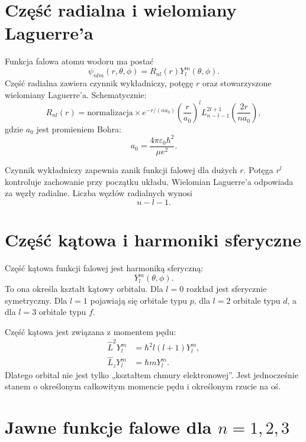 \section{Część radialna i wielomiany Laguerre'a}

Funkcja falowa atomu wodoru ma postać
\begin{equation}
    \psi_{nlm}(r,\theta,\phi)=R_{nl}(r)Y_l^m(\theta,\phi).
\end{equation}
Część radialna zawiera czynnik wykładniczy, potęgę \(r\) oraz stowarzyszone wielomiany Laguerre'a. Schematycznie:
\begin{equation}
    R_{nl}(r)=\text{normalizacja}\times e^{-r/(na_0)}
    \left(\frac{r}{a_0}\right)^l
    L_{n-l-1}^{2l+1}\left(\frac{2r}{na_0}\right),
\end{equation}
gdzie \(a_0\) jest promieniem Bohra:
\begin{equation}
    a_0=\frac{4\pi\varepsilon_0\hbar^2}{\mu e^2}.
\end{equation}

Czynnik wykładniczy zapewnia zanik funkcji falowej dla dużych \(r\). Potęga \(r^l\) kontroluje zachowanie przy początku układu. Wielomian Laguerre'a odpowiada za węzły radialne. Liczba węzłów radialnych wynosi
\begin{equation}
    n-l-1.
\end{equation}

\section{Część kątowa i harmoniki sferyczne}

Część kątowa funkcji falowej jest harmoniką sferyczną:
\begin{equation}
    Y_l^m(\theta,\phi).
\end{equation}
To ona określa kształt kątowy orbitalu. Dla \(l=0\) rozkład jest sferycznie symetryczny. Dla \(l=1\) pojawiają się orbitale typu \(p\), dla \(l=2\) orbitale typu \(d\), a dla \(l=3\) orbitale typu \(f\).

Część kątowa jest związana z momentem pędu:
\begin{align}
    \hat{L}^2Y_l^m &= \hbar^2l(l+1)Y_l^m,\\
    \hat{L}_zY_l^m &= \hbar mY_l^m.
\end{align}
Dlatego orbital nie jest tylko „kształtem chmury elektronowej”. Jest jednocześnie stanem o określonym całkowitym momencie pędu i określonym rzucie na oś.

\section{Jawne funkcje falowe dla \texorpdfstring{\(n=1,2,3\)}{n=1,2,3}}

